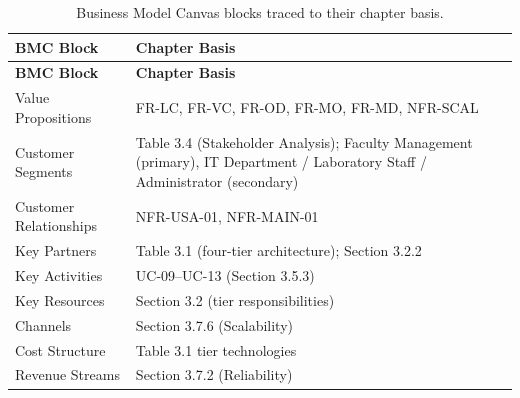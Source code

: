 \begin{longtable}{|L{3.2cm}|L{8.5cm}|}
	\caption{Business Model Canvas blocks traced to their chapter basis.} \label{tab:3-3}                                                                 \\
	\hline
	\textbf{BMC Block}     & \textbf{Chapter Basis}                                                                                                       \\
	\hline
	\endfirsthead
	\hline
	\textbf{BMC Block}     & \textbf{Chapter Basis}                                                                                                       \\
	\hline
	\endhead
	\hline
	\endfoot
	\hline
	\endlastfoot
	Value Propositions     & FR-LC, FR-VC, FR-OD, FR-MO, FR-MD, NFR-SCAL                                                                                  \\
	\hline
	Customer Segments      & Table 3.4 (Stakeholder Analysis); Faculty Management (primary), IT Department / Laboratory Staff / Administrator (secondary) \\
	\hline
	Customer Relationships & NFR-USA-01, NFR-MAIN-01                                                                                                      \\
	\hline
	Key Partners           & Table 3.1 (four-tier architecture); Section 3.2.2                                                                            \\
	\hline
	Key Activities         & UC-09--UC-13 (Section 3.5.3)                                                                                                 \\
	\hline
	Key Resources          & Section 3.2 (tier responsibilities)                                                                                          \\
	\hline
	Channels               & Section 3.7.6 (Scalability)                                                                                                  \\
	\hline
	Cost Structure         & Table 3.1 tier technologies                                                                                                  \\
	\hline
	Revenue Streams        & Section 3.7.2 (Reliability)                                                                                                  \\
	\hline
\end{longtable}

